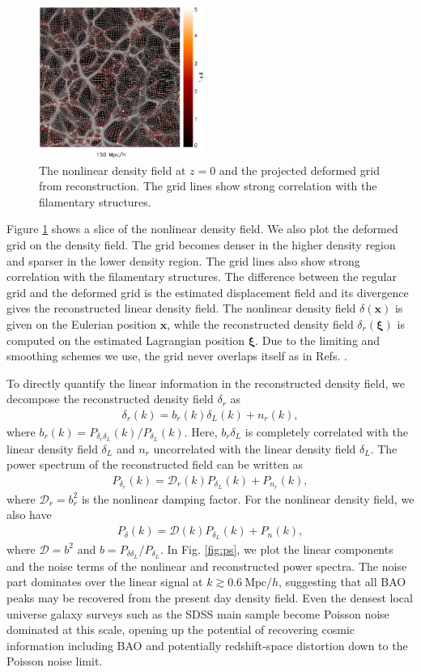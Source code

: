 \documentclass[aps,prl,twocolumn,showpacs,superscriptaddress,groupedaddress,nofootinbib]{revtex4}  %
\newcommand{\mr}{\mathrm}
\newcommand{\mc}{\mathcal}
\newcommand{\bea}{\begin{eqnarray}}
\newcommand{\eea}{\end{eqnarray}}
\begin{document}
\begin{figure}[tbp]
\begin{center}
\includegraphics[width=0.48\textwidth]{map0512-0128_i1500_.eps}
\end{center}
\vspace{-0.7cm}
\caption{The nonlinear density field at $z=0$ and the projected deformed grid 
from reconstruction. 
The grid lines show strong correlation with the filamentary structures.}
\label{fig:den}
\end{figure}

Figure \ref{fig:den} shows a slice of the nonlinear density field. 
We also plot the deformed grid on the density field. The grid becomes 
denser in the higher density region and sparser in the lower density region.
The grid lines also show strong correlation with the filamentary structures.
The difference between the regular grid and the deformed grid is the estimated
displacement field and its divergence gives the reconstructed linear density 
field. The nonlinear density field $\delta(\bm{x})$ is given on the Eulerian 
position $\bm{x}$, while the reconstructed density field $\delta_r(\bm{\xi})$ 
is computed on the estimated Lagrangian position $\bm{\xi}$. Due to the 
limiting and smoothing schemes we use, the grid never overlaps itself as in 
Refs. \cite{1995ApJS..100..269P,1998ApJS..115...19P}.

To directly quantify the linear information in the reconstructed
density field, we decompose the reconstructed density field $\delta_r$ as
\bea
\delta_r(k)=b_r(k)\delta_L(k)+n_r(k),
\eea
where $b_r(k)=P_{\delta_r\delta_L}(k)/P_{\delta_L}(k)$. 
Here, $b_r\delta_L$ is completely correlated with the linear density field 
$\delta_L$ and $n_r$ uncorrelated with the linear density field $\delta_L$.
The power spectrum of the reconstructed field can be written as
\bea
P_{\delta_r}(k)=\mc{D}_r(k)P_{\delta_L}(k)+P_{n_r}(k),
\eea
where $\mc{D}_r=b_r^2$ is the nonlinear damping factor. 
For the nonlinear density field, we also have
\bea
P_{\delta}(k)=\mc{D}(k)P_{\delta_L}(k)+P_{n}(k),
\eea
where $\mc{D}=b^2$ and $b=P_{\delta\delta_L}/P_{\delta_L}$. 
In Fig. \ref{fig:ps}, we plot the linear components and the noise terms of the
nonlinear and reconstructed power spectra. The noise part dominates over the linear 
signal at $k\gtrsim0.6\ \mr{Mpc}/h$, suggesting that all BAO peaks may
be recovered from the present day density field.  Even the densest local
universe galaxy surveys such as the SDSS main sample become Poisson
noise dominated at this scale, opening up the potential of recovering
cosmic information including BAO and potentially redshift-space
distortion down to the Poisson noise limit.  
\end{document}
